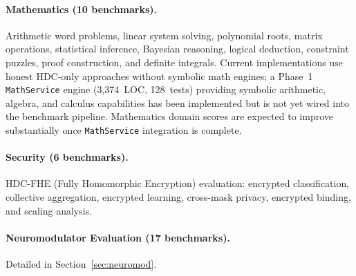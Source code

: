 \documentclass[11pt,letterpaper]{article}
\begin{document}
\paragraph{Mathematics (10 benchmarks).} Arithmetic word problems, linear system solving, polynomial roots, matrix operations, statistical inference, Bayesian reasoning, logical deduction, constraint puzzles, proof construction, and definite integrals. Current implementations use honest HDC-only approaches without symbolic math engines; a Phase~1 \texttt{MathService} engine (3,374~LOC, 128~tests) providing symbolic arithmetic, algebra, and calculus capabilities has been implemented but is not yet wired into the benchmark pipeline. Mathematics domain scores are expected to improve substantially once \texttt{MathService} integration is complete.

\paragraph{Security (6 benchmarks).} HDC-FHE (Fully Homomorphic Encryption) evaluation: encrypted classification, collective aggregation, encrypted learning, cross-mask privacy, encrypted binding, and scaling analysis.

\paragraph{Neuromodulator Evaluation (17 benchmarks).} Detailed in Section~\ref{sec:neuromod}.
\end{document}
